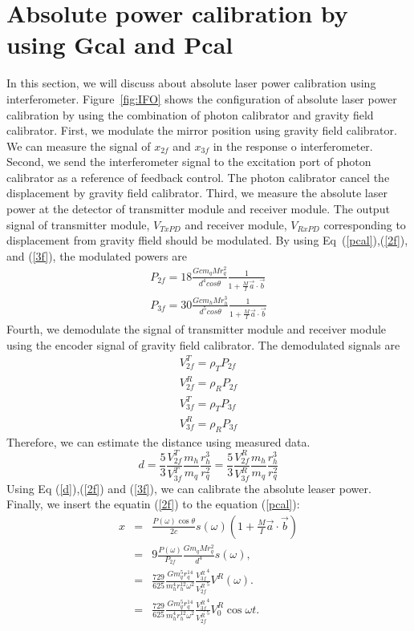 \documentclass[12pt]{iopart}
\begin{document}
\section{Absolute power calibration by using Gcal and Pcal}
In this section, we will discuss about absolute laser power calibration using interferometer. 
Figure~\ref{fig:IFO} shows the configuration of absolute laser power calibration by using the combination of photon calibrator and gravity field calibrator.
First, we modulate the mirror position using gravity field calibrator. We can measure the signal of $x_{2f}$ and $x_{3f}$ in the response o interferometer. Second, we send the interferometer signal to the excitation port of photon calibrator as a reference of feedback control. The photon calibrator cancel the displacement by gravity field calibrator. Third, we measure the absolute laser power at the detector of transmitter module and receiver module. The output signal of transmitter module, $V_{TxPD}$ and receiver module, $V_{RxPD}$ corresponding to displacement from gravity ffield should be modulated. By using Eq~(\ref{pcal}),(\ref{2f}), and (\ref{3f}), the modulated powers are
\begin{eqnarray}
 P_{2f}=18 \frac{Gcm_{q}Mr_{q}^2}{d^4cos\theta}\frac{1}{1+\frac{M}{I}\vec{a}\cdot \vec{b}} \label{2f} \\
 P_{3f}= 30\frac{Gcm_{h}Mr_{h}^3}{d^5cos\theta}\frac{1}{1+\frac{M}{I}\vec{a}\cdot \vec{b}} \label{3f}
\end{eqnarray}
Fourth, we demodulate the signal of transmitter module and receiver module using the encoder signal of gravity field calibrator.
The demodulated signals are 
\begin{eqnarray}
V_{2f}^{T}=\rho_{T}P_{2f} \\
V_{2f}^{R}=\rho_{R}P_{2f} \\
V_{3f}^{T}=\rho_{T}P_{3f} \\
V_{3f}^{R}=\rho_{R}P_{3f} 
\end{eqnarray} 
Therefore, we can estimate the distance using measured data. 
\begin{equation}
d=\frac{5}{3} \frac{V_{2f}^T}{V_{3f}^T}\frac{m_{h}}{m_{q}}\frac{r_{h}^{3}}{r_{q}^{2}}=\frac{5}{3} \frac{V_{2f}^R}{V_{3f}^R}\frac{m_{h}}{m_{q}}\frac{r_{h}^{3}}{r_{q}^{2}} \label{d}
\end{equation}
Using Eq (\ref{d}),(\ref{2f}) and (\ref{3f}), we can calibrate the absolute leaser power.
Finally, we insert the equatin (\ref{2f}) to the equation (\ref{pcal}):
\begin{eqnarray}
x&=&\frac{P(\omega) \cos{\theta}}{2c} s(\omega)\left(1+\frac{M}{I}\vec{a} \cdot \vec{b} \right) \\
 &=&9\frac{P(\omega)}{P_{2f}}\frac{Gm_q M r_q^2}{d^4}s(\omega) , \\
 &=&\frac{729}{625} \frac{G m^5_q r_{q}^{14}}{m^4_h r_h^{12} \omega^2} \frac{{V_{3f}^{R}}^4}{{V_{2f}^{R}}^5}V^R(\omega) .\\
 &=&\frac{729}{625} \frac{G m^5_q r_{q}^{14}}{m^4_h r_h^{12} \omega^2} \frac{{V_{3f}^{R}}^4}{{V_{2f}^{R}}^5}V^R_0 \cos{\omega t} .\\ 
\end{eqnarray}
\end{document}

